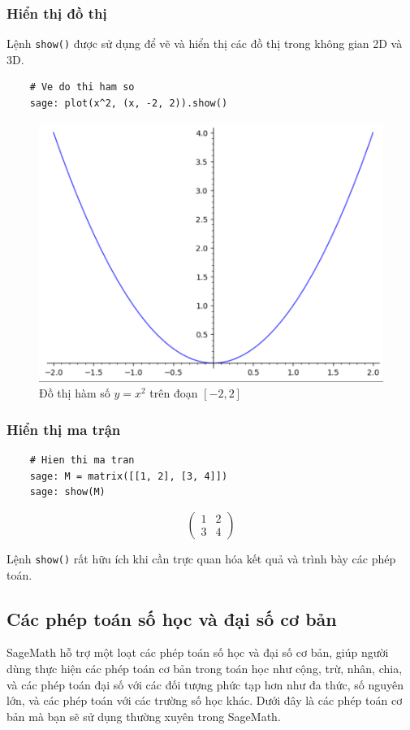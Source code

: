\subsubsection{Hiển thị đồ thị}

Lệnh \texttt{show()} được sử dụng để vẽ và hiển thị các đồ thị trong không gian 2D và 3D.

\begin{lstlisting}
	# Ve do thi ham so
	sage: plot(x^2, (x, -2, 2)).show()
\end{lstlisting}
\begin{figure}[H]
	\centering
	\includegraphics[width=0.7\linewidth]{images/screenshot007}
	\caption{Đồ thị hàm số $y=x^2$ trên đoạn $\left[-2,2\right]$}
	\label{fig:screenshot007}
\end{figure}

\subsubsection{Hiển thị ma trận}

\begin{lstlisting}
	# Hien thi ma tran
	sage: M = matrix([[1, 2], [3, 4]])
	sage: show(M)
\end{lstlisting}
$$\displaystyle \left(\begin{array}{rr}
	1 & 2 \\
	3 & 4
\end{array}\right)$$

Lệnh \texttt{show()} rất hữu ích khi cần trực quan hóa kết quả và trình bày các phép toán.

\subsection{Các phép toán số học và đại số cơ bản}

SageMath hỗ trợ một loạt các phép toán số học và đại số cơ bản, giúp người dùng thực hiện các phép toán cơ bản trong toán học như cộng, trừ, nhân, chia, và các phép toán đại số với các đối tượng phức tạp hơn như đa thức, số nguyên lớn, và các phép toán với các trường số học khác. Dưới đây là các phép toán cơ bản mà bạn sẽ sử dụng thường xuyên trong SageMath.

